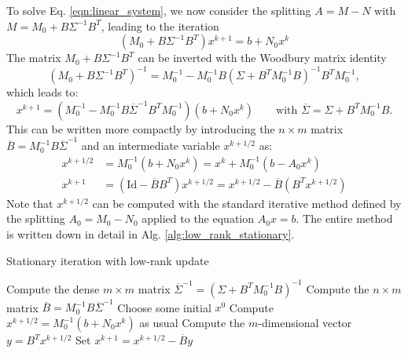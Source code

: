 \documentclass[11pt]{article}
\begin{document}
To solve Eq. \eqref{eqn:linear_system}, we now consider the splitting $A=M-N$ with $M=M_0 + B \Sigma^{-1} B^T$, leading to the iteration
\begin{equation}
    \left(M_0 + B \Sigma^{-1} B^T \right)x^{k+1} = b + N_0 x^k\label{eqn:low_rank_iteration}
\end{equation}
The matrix $M_0 + B \Sigma^{-1}B^T$ can be inverted with the Woodbury matrix identity
\begin{equation}
    \left(M_0 + B \Sigma^{-1} B^T \right)^{-1} = M_0^{-1} - M_0^{-1} B \left(\Sigma + B^TM_0^{-1}B\right)^{-1}B^TM_0^{-1},
\end{equation}
which leads to:
\begin{equation}
    x^{k+1} = \left(M_0^{-1}-M_0^{-1}B \overline{\Sigma}^{-1}B^T M_0^{-1}\right)\left(b+N_0x^k\right)
    \qquad\text{with $\overline{\Sigma} = \Sigma + B^TM_0^{-1}B$}.
\end{equation}
This can be written more compactly by introducing the $n\times m$ matrix $\overline{B} = M_0^{-1} B \overline{\Sigma}^{-1}$ and an intermediate variable $x^{k+1/2}$ as:
\begin{equation}
    \begin{aligned}
        x^{k+1/2} & = M_0^{-1}(b+N_0x^k) = x^k + M_0^{-1}(b-A_0x^k)                                                           \\
        x^{k+1}   & = \left(\text{Id}-\overline{B} B^T\right) x^{k+1/2} = x^{k+1/2} - \overline{B} \left(B^T x^{k+1/2}\right)
    \end{aligned}
\end{equation}
Note that $x^{k+1/2}$ can be computed with the standard iterative method defined by the splitting $A_0=M_0-N_0$ applied to the equation $A_0x=b$. The entire method is written down in detail in Alg. \ref{alg:low_rank_stationary}.
\begin{algorithm}
    \caption{Stationary iteration with low-rank update}\label{alg:low_rank_stationary}
    \begin{algorithmic}[1]
        \State Compute the dense $m\times m$ matrix $\overline{\Sigma}^{-1} = (\Sigma+B^TM_0^{-1}B)^{-1}$
        \State Compute the $n\times m$ matrix $\overline{B}= M_0^{-1} B\overline{\Sigma}^{-1}$
        \State Choose some initial $x^0$
        \State Compute $x^{k+1/2} = M_0^{-1} (b+N_0 x^k)$ as usual
        \State Compute the $m$-dimensional vector $y = B^T x^{k+1/2}$
        \State Set $x^{k+1} = x^{k+1/2} - \overline{B} y$
        \EndFor
    \end{algorithmic}
\end{algorithm}
\end{document}

